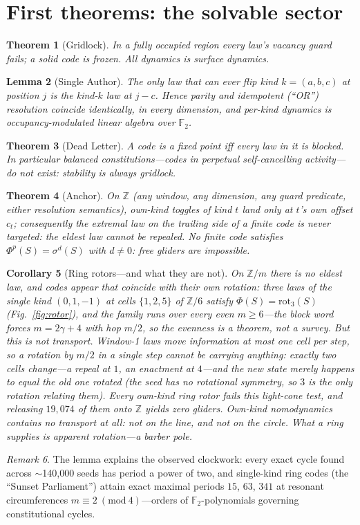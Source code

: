 \documentclass[10pt]{article}
\newtheorem{theorem}{Theorem}
\newtheorem{lemma}[theorem]{Lemma}
\newtheorem{corollary}[theorem]{Corollary}
\theoremstyle{definition}
\theoremstyle{remark}
\newtheorem{remark}[theorem]{Remark}
\begin{document}
\section{First theorems: the solvable sector}
\begin{theorem}[Gridlock]
In a fully occupied region every law's vacancy guard fails; a solid code is
frozen. All dynamics is surface dynamics.
\end{theorem}
\begin{lemma}[Single Author]
The only law that can ever flip kind $k=(a,b,c)$ at position $j$ is the
kind-$k$ law at $j-c$. Hence parity and idempotent (``OR'') resolution
coincide identically, in every dimension, and per-kind dynamics is
occupancy-modulated linear algebra over $\mathbb{F}_2$.
\end{lemma}
\begin{theorem}[Dead Letter]
A code is a fixed point iff every law in it is blocked. In particular
\emph{balanced constitutions}---codes in perpetual self-cancelling
activity---do not exist: stability is always gridlock.
\end{theorem}
\begin{theorem}[Anchor]
On $\mathbb{Z}$ (any window, any dimension, any guard predicate, either
resolution semantics), own-kind toggles of kind $t$ land only at $t$'s own
offset $c_t$; consequently the extremal law on the trailing side of a finite
code is never targeted: \emph{the eldest law cannot be repealed}. No finite
code satisfies $\Phi^p(S)=\sigma^d(S)$ with $d\neq0$: free gliders are
impossible.
\end{theorem}
\begin{corollary}[Ring rotors---and what they are not]
On $\mathbb{Z}/m$ there is no eldest law, and codes appear that coincide with
their own rotation: three laws of the single kind $(0,1,-1)$ at cells
$\{1,2,5\}$ of $\mathbb{Z}/6$ satisfy $\Phi(S)=\mathrm{rot}_3(S)$
(Fig.~\ref{fig:rotor}), and the family runs over every even $m\ge6$---the block
word forces $m=2\gamma+4$ with hop $m/2$, so the evenness is a theorem, not a
survey. \emph{But this is not transport.} Window-1 laws move information at most
one cell per step, so a rotation by $m/2$ in a single step cannot be carrying
anything: exactly two cells change---a repeal at $1$, an enactment at $4$---and
the new state merely happens to equal the old one rotated (the seed has no
rotational symmetry, so $3$ is the only rotation relating them). Every own-kind
ring rotor fails this light-cone test, and releasing $19{,}074$ of them onto
$\mathbb{Z}$ yields zero gliders. \emph{Own-kind nomodynamics contains no
transport at all: not on the line, and not on the circle. What a ring supplies
is apparent rotation---a barber pole.}
\end{corollary}
\begin{remark}
The lemma explains the observed clockwork: every exact cycle found across
$\sim$140{,}000 seeds has period a power of two, and single-kind ring codes
(the ``Sunset Parliament'') attain exact maximal periods $15$, $63$, $341$ at
resonant circumferences $m\equiv2\ (\mathrm{mod}\ 4)$---orders of
$\mathbb{F}_2$-polynomials governing constitutional cycles.
\end{remark}
\end{document}

